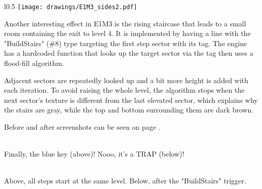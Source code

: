 \par
\begin{wrapfigure}[23]{l}{0.5\textwidth}
\centering
\texttt{[image: drawings/E1M3\_sides2.pdf]}
\end{wrapfigure}
Another interesting effect in E1M3 is the rising staircase that leads to a small room containing the exit to level 4. It is implemented by having a line with the "BuildStairs" (\#8) type targeting the first step sector with its tag. The engine has a hardcoded  function that looks up the target sector via the tag then uses a flood-fill algorithm.\\
\par Adjacent sectors are repeatedly looked up and a bit more height is added with each iteration. To avoid raising the whole level, the algorithm stops when the next sector's texture is different from the last elevated sector, which explains why the stairs are gray, while the top and bottom surrounding them are dark brown.\\
\par
Before and after screenshots can be seen on page \pageref{stairs}.


 \label{e1m3_trap} \\
Finally, the blue key (above)! Nooo, it's a TRAP (below)!

\vspace{2mm}
 \label{stairs} \\
Above, all steps start at the same level. Below, after the "BuildStairs" trigger. 

\vspace{2mm}



